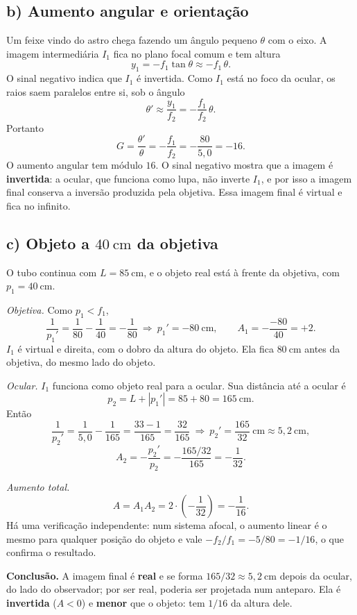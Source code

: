 \documentclass{article}%
\begin{document}
\subsection*{b) Aumento angular e orientação}
Um feixe vindo do astro chega fazendo um ângulo pequeno $\theta$ com o eixo. A imagem intermediária $I_1$ fica no plano focal comum e tem altura
\[
y_1=-f_1\tan\theta\approx -f_1\,\theta .
\]
O sinal negativo indica que $I_1$ é invertida. Como $I_1$ está no foco da ocular, os raios saem paralelos entre si, sob o ângulo
\[
\theta'\approx \frac{y_1}{f_2}=-\frac{f_1}{f_2}\,\theta .
\]
Portanto
\[
G=\frac{\theta'}{\theta}=-\frac{f_1}{f_2}=-\frac{80}{5{,}0}=-16 .
\]
O aumento angular tem módulo $16$. O sinal negativo mostra que a imagem é \textbf{invertida}: a ocular, que funciona como lupa, não inverte $I_1$, e por isso a imagem final conserva a inversão produzida pela objetiva. Essa imagem final é virtual e fica no infinito.

\subsection*{c) Objeto a $40\ \text{cm}$ da objetiva}
O tubo continua com $L=85\ \text{cm}$, e o objeto real está à frente da objetiva, com $p_1=40\ \text{cm}$.

\textit{Objetiva.} Como $p_1<f_1$,
\[
\frac{1}{p_1'}=\frac{1}{80}-\frac{1}{40}=-\frac{1}{80}\ \Rightarrow\ p_1'=-80\ \text{cm},\qquad A_1=-\frac{-80}{40}=+2 .
\]
$I_1$ é virtual e direita, com o dobro da altura do objeto. Ela fica $80\ \text{cm}$ antes da objetiva, do mesmo lado do objeto.

\textit{Ocular.} $I_1$ funciona como objeto real para a ocular. Sua distância até a ocular é
\[
p_2=L+|p_1'|=85+80=165\ \text{cm}.
\]
Então
\[
\frac{1}{p_2'}=\frac{1}{5{,}0}-\frac{1}{165}=\frac{33-1}{165}=\frac{32}{165}
\ \Rightarrow\ p_2'=\frac{165}{32}\ \text{cm}\approx 5{,}2\ \text{cm},
\]
\[
A_2=-\frac{p_2'}{p_2}=-\frac{165/32}{165}=-\frac{1}{32}.
\]

\textit{Aumento total.}
\[
A=A_1A_2=2\cdot\left(-\frac{1}{32}\right)=-\frac{1}{16}.
\]
Há uma verificação independente: num sistema afocal, o aumento linear é o mesmo para qualquer posição do objeto e vale $-f_2/f_1=-5/80=-1/16$, o que confirma o resultado.

\textbf{Conclusão.} A imagem final é \textbf{real} e se forma $165/32\approx 5{,}2\ \text{cm}$ depois da ocular, do lado do observador; por ser real, poderia ser projetada num anteparo. Ela é \textbf{invertida} ($A<0$) e \textbf{menor} que o objeto: tem $1/16$ da altura dele.
\end{document}
